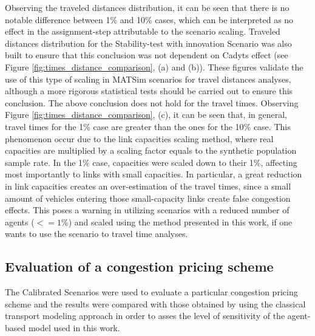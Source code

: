 \documentclass[Journal,letterpaper]{ascelike-new}
\begin{document}
Observing the traveled distances distribution, it can be seen that there is no notable difference between 1\% and 10\% cases, which can be interpreted as no effect in the assignment-step attributable to the scenario scaling. Traveled distances distribution for the Stability-test with innovation Scenario was also built to ensure that this conclusion was not dependent on Cadyts effect (see Figure \ref{fig:times_distance_comparison}, (a) and (b)). These figures validate the use of this type of scaling in MATSim scenarios for travel distances analyses, although a more rigorous statistical tests should be carried out to ensure this conclusion.
The above conclusion does not hold for the travel times. Observing Figure \ref{fig:times_distance_comparison}, (c), it can be seen that, in general, travel times for the 1\% case are greater than the ones for the 10\% case. This phenomenon occur due to the link capacities scaling method, where real capacities are multiplied by a scaling factor equals to the synthetic population sample rate. In the 1\% case, capacities were scaled down to their 1\%, affecting most importantly to links with small capacities. In particular, a great reduction in link capacities creates an over-estimation of the travel times, since a small amount of vehicles entering those small-capacity links create false congestion effects. This poses a warning in utilizing scenarios with a reduced number of agents ($<=1\%$) and scaled using the method presented in this work, if one wants to use the scenario to travel time analyses.
\subsection{Evaluation of a congestion pricing scheme}

The Calibrated Scenarios were used to evaluate a particular congestion pricing scheme and the results were compared with those obtained by \cite{gleave2009tarificacion} using the classical transport modeling approach in order to asses the level of sensitivity of the agent-based model used in this work.
\end{document}
